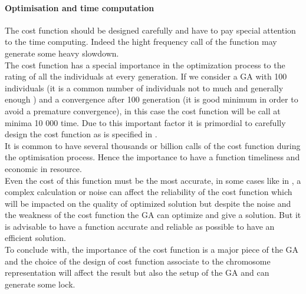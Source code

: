 \paragraph*{Optimisation and time computation}

The cost function should be designed carefully and have to pay special attention to the time computing. Indeed the hight frequency call of the function may generate some heavy slowdown. \\
The cost function has a special importance in the optimization process to  the rating of all the individuals at every generation. If we consider a GA with 100 individuals (it is a common number of individuals  not to much and  generally enough ) and a convergence after 100 generation (it is good minimum in order to avoid a premature convergence), in this case the cost function will be call at minima 10 000 time. Due  to this important factor it is primordial to carefully design the cost function as is specified in \cite{70*arabas1994}.\\
It is common to have several thousands or billion calls of the cost function during the optimisation process.
  Hence the importance to have a function timeliness and economic in resource. \\
Even the cost of this function must be the most accurate, in some cases like in \cite{95*miller1995}, a complex calculation or noise can affect the reliability of the cost function which will be impacted on the quality of optimized solution but despite the noise and the weakness of the cost function the GA can optimize and give a solution. But it is advisable to have a function accurate and reliable as possible to have an efficient solution.\\
 To conclude with, the importance of the cost function is a major piece of the GA and the choice of the design of cost function associate to the chromosome representation will affect the result but also the setup of the GA and can generate some lock. \\

	
